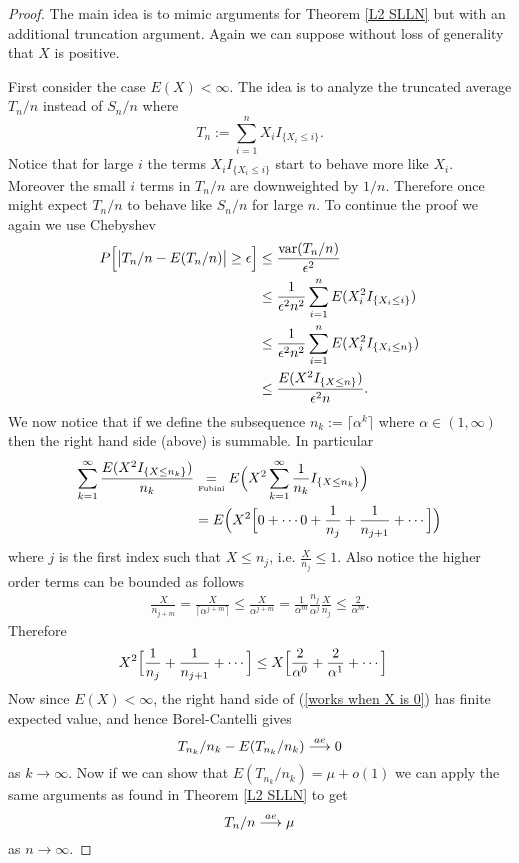 \begin{proof}
The main idea is to mimic arguments for Theorem \ref{L2 SLLN} but with an additional truncation argument. Again we can suppose without loss of generality  that $X$ is positive. 

First consider the case $E(X)<\infty$. The idea is to analyze the truncated average $T_n/n$  instead of $S_n/n$ where
\[T_n :=\sum_{i=1}^n X_i I_{\{X_i\leq i\}}. \]
Notice that for large $i$ the terms $X_i I_{\{X_i\leq i\}}$ start to behave more like $X_i$. Moreover the small $i$ terms in $T_n/n$ are downweighted by $1/n$. Therefore once might expect $T_n/n$ to behave like $S_n/n$ for large $n$. To continue the proof we again we use Chebyshev
\begin{align}
\nonumber P\Bigl[\bigl| T_n/n - E(T_n/n)\bigr| \geq \epsilon \Bigr] &\leq \frac{\text{var}(T_n/n)}{\epsilon^2} \\
\nonumber &\leq \frac{1}{\epsilon^2 n^2}\sum_{i=1}^nE(X_i^2 I_{\{X_i\leq i\}}) \\
\nonumber &\leq \frac{1}{\epsilon^2 n^2}\sum_{i=1}^nE(X_i^2 I_{\{X_i\leq n\}}) \\
\label{cheb sum} &\leq \frac{E(X^2 I_{\{X\leq n\}}) }{\epsilon^2 n}.
\end{align}
We now notice that if we define the subsequence $n_k:= \lceil \alpha^k \rceil$ where $\alpha \in (1,\infty)$ then the right hand side (above) is summable. In particular 
\begin{align*}
\sum_{k=1}^\infty \frac{E(X^2 I_{\{X\leq n_k\}})}{n_k} 
&\underset{\text{\tiny Fubini}} =  E\Bigl(X^2\sum_{k=1}^\infty \frac{1}{n_k}I_{\{X\leq n_k\}}\Bigr) \\
& =  E\Bigl(X^2\Bigl[0+\cdots 0 + \frac{1}{n_j} + \frac{1}{n_{j+1}} +\cdots \Bigr]\Bigr)
\end{align*}
where $j$ is the first index such that $X\leq n_j$, i.e. $\frac{X}{n_j}\leq 1$. Also notice the higher order terms can be bounded as follows 
\begin{align*}
\frac{X}{n_{j+m}}  = \frac{X}{\lceil \alpha^{j+m} \rceil}\leq \frac{X}{ \alpha^{j+m} } =  \frac{1}{\alpha^m} \frac{n_j}{\alpha^j} \frac{X}{n_j} \leq   \frac{2}{\alpha^m}.
\end{align*}
Therefore
\begin{align}
\label{works when X is 0}
X^2\Bigl[&\frac{1}{n_j} + \frac{1}{n_{j+1}} +\cdots \Bigr] \leq X\Bigl[ \frac{2}{\alpha^0} +\frac{2}{\alpha^1} +\cdots \Bigr]
\end{align}
Now since $E(X)<\infty$, the right hand side of (\ref{works when X is 0}) has finite expected value, and hence Borel-Cantelli gives
\begin{equation}
\label{SLLN: e1111}
T_{n_k}/n_k - E(T_{n_k}/n_k) \overset{\small ae} \longrightarrow 0
\end{equation}
as $k\rightarrow \infty$.
Now if we can show that $E(T_{n_k}/n_k)  = \mu + o(1)$ we can 
apply the same arguments as found in Theorem \ref{L2 SLLN} to get
\begin{equation}
\label{SLLN: e1}
T_{n}/n \overset{\small ae} \longrightarrow \mu
\end{equation}
as $n\rightarrow \infty$.


\end{proof}
